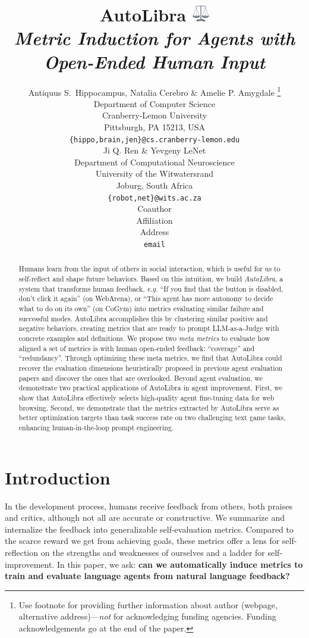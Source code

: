 \documentclass{article} %
\title{AutoLibra \protect\includegraphics[height=1em]{Template-2025/figs/scale.png}\\ \textit{Metric Induction for Agents with Open-Ended Human Input}}
\author{Antiquus S.~Hippocampus, Natalia Cerebro \& Amelie P. Amygdale \thanks{ Use footnote for providing further information
about author (webpage, alternative address)---\emph{not} for acknowledging
funding agencies.  Funding acknowledgements go at the end of the paper.} \\
Department of Computer Science\\
Cranberry-Lemon University\\
Pittsburgh, PA 15213, USA \\
\texttt{\{hippo,brain,jen\}@cs.cranberry-lemon.edu} \\
\And
Ji Q. Ren \& Yevgeny LeNet \\
Department of Computational Neuroscience \\
University of the Witwatersrand \\
Joburg, South Africa \\
\texttt{\{robot,net\}@wits.ac.za} \\
\AND
Coauthor \\
Affiliation \\
Address \\
\texttt{email}
}
\begin{document}
\ifcolmsubmission
\linenumbers
\fi

\maketitle

\begin{abstract}
Humans learn from the input of others in social interaction, which is useful for us to self-reflect and shape future behaviors. 
Based on this intuition, we build \emph{AutoLibra}, a system that transforms human feedback, \emph{e.g.} ``If you find that the button is disabled, don't click it again''
(on WebArena), or ``This agent has more autonomy to decide what to do on its own''
(on CoGym) into metrics evaluating similar failure and successful modes. AutoLibra accomplishes this by clustering similar
positive and negative behaviors, creating metrics that are ready to prompt LLM-as-a-Judge with concrete examples and definitions. 
We propose two \emph{meta metrics} to evaluate how aligned a set of metrics is with human open-ended feedback: ``coverage'' and ``redundancy''. Through optimizing these meta metrics, we find that AutoLibra could recover the evaluation dimensions heuristically proposed in previous agent evaluation papers and discover the ones that are overlooked.
Beyond agent evaluation, we demonstrate two practical applications of
AutoLibra in agent improvement. First, we show that AutoLibra effectively
selects high-quality agent fine-tuning data for web browsing.
Second, we demonstrate that the metrics extracted by AutoLibra serve as better optimization targets
than task success rate on two challenging text game tasks, enhancing human-in-the-loop prompt engineering.
\end{abstract}

\section{Introduction}
In the development process, humans receive feedback from others,
both praises and critics, although not all are accurate or constructive.
We summarize and internalize the feedback into
generalizable self-evaluation metrics. Compared to the scarce reward
we get from achieving goals, these metrics offer a lens for self-reflection on the
strengths and weaknesses of ourselves and a ladder for self-improvement.
In this paper, we ask: \textbf{can we automatically induce metrics to train and evaluate language agents from natural language feedback?} 
\end{document}
